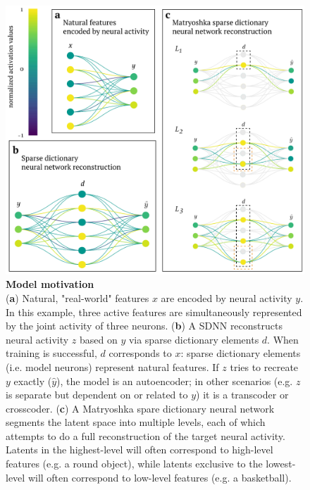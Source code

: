 \begin{figure}[h]
    \begin{minipage}{0.63\linewidth}
    \includegraphics[width=\linewidth]{figures/sdnn_arch.pdf}
    \end{minipage}%
    \begin{minipage}{0.37\linewidth}
    \caption{
        \textbf{Model motivation} \\
        \small
        (\textbf{a}) Natural, "real-world" features $x$ are encoded by neural activity $y$. In this example, three active features are simultaneously represented by the joint activity of three neurons. (\textbf{b}) A SDNN reconstructs neural activity $z$ based on $y$ via sparse dictionary elements $d$. When training is successful, $d$ corresponds to $x$: sparse dictionary elements (i.e. model neurons) represent natural features. If $z$ tries to recreate $y$ exactly ($\hat{y}$), the model is an autoencoder; in other scenarios (e.g. $z$ is separate but dependent on or related to $y$) it is a transcoder or crosscoder. (\textbf{c}) A Matryoshka spare dictionary neural network segments the latent space into multiple levels, each of which attempts to do a full reconstruction of the target neural activity. Latents in the highest-level will often correspond to high-level features (e.g. a round object), while latents exclusive to the lowest-level will often correspond to low-level features (e.g. a basketball).
    }
    \label{fig:sdnn_arch}
    \end{minipage}
\end{figure}


